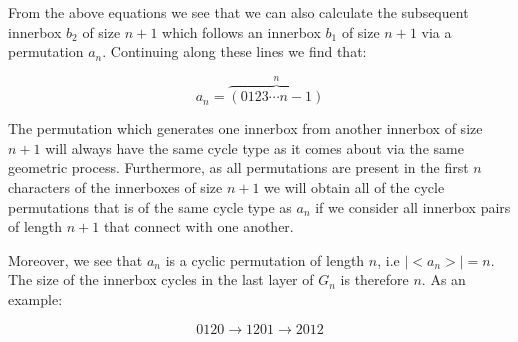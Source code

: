 \documentclass[a4paper,10pt]{article}
\theoremstyle{definition}
\begin{document}
From the above equations we see that we can also calculate the subsequent innerbox $b_2$ of size $n+1$ which follows an innerbox $b_1$ of size $n+1$ via a permutation $a_n$. Continuing along these lines we find that:

\begin{equation}
a_n = \overbrace{(0123\cdots n-1)}^n 
\end{equation}

The permutation which generates one innerbox from another innerbox of size $n+1$ will always have the same cycle type as it comes about via the same geometric process. Furthermore, as all permutations are present in the first $n$ characters of the innerboxes of size $n+1$ we will obtain all of the cycle permutations that is of the same cycle type as $a_n$ if we consider all innerbox pairs of length $n+1$ that connect with one another.

Moreover, we see that $a_n$ is a cyclic permutation of length $n$, i.e $|\!\!<\!\!a_n\!\!>\!\!|=n$. The size of the innerbox cycles in the last layer of $G_n$ is therefore $n$. As an example:

\begin{equation}
0120\rightarrow 1201 \rightarrow 2012 
\end{equation}
\end{document}
